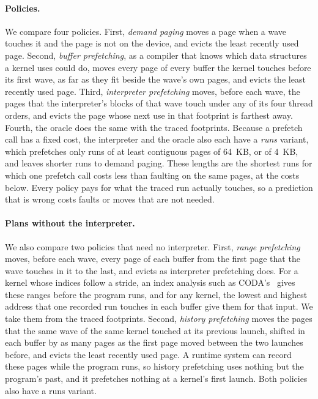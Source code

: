 \documentclass[11pt]{article}
\newcommand{\term}[1]{\emph{#1}}
\begin{document}
\paragraph{Policies.} We compare four policies. First, \term{demand paging} moves a page when a wave touches it and
the page is not on the device, and evicts the least recently used page. Second, \term{buffer prefetching}, as a
compiler that knows which data structures a kernel uses could do, moves every page of every buffer the kernel
touches before its first wave, as far as they fit beside the wave's own pages, and evicts the least recently used
page. Third, \term{interpreter prefetching} moves, before each wave, the pages that the interpreter's blocks of that
wave touch under any of its four thread orders, and evicts the page whose next use in that footprint is farthest
away. Fourth, the oracle does the same with the traced footprints. Because a prefetch call has a fixed cost, the
interpreter and the oracle also each have a \term{runs} variant, which prefetches only runs of at least
\numUvmMinRun{} contiguous pages of 64~KB, or \numUvmMinRunFour{} of 4~KB, and leaves shorter runs to demand paging.
These lengths are the shortest runs for which one prefetch call costs less than faulting on the same pages, at the
costs below. Every policy pays for what the traced run actually touches, so a prediction that is wrong costs faults
or moves that are not needed.

\paragraph{Plans without the interpreter.} We also compare two policies that need no interpreter. First,
\term{range prefetching} moves, before each wave, every page of each buffer from the first page that the wave
touches in it to the last, and evicts as interpreter prefetching does. For a kernel whose indices follow a stride,
an index analysis such as CODA's~\cite{Kim2018CODA} gives these ranges before the program runs, and for any kernel,
the lowest and highest address that one recorded run touches in each buffer give them for that input. We take them
from the traced footprints. Second, \term{history prefetching} moves the pages that the same wave of the same kernel
touched at its previous launch, shifted in each buffer by as many pages as the first page moved between the two
launches before, and evicts the least recently used page. A runtime system can record these pages while the program
runs, so history prefetching uses nothing but the program's past, and it prefetches nothing at a kernel's first
launch. Both policies also have a runs variant.
\end{document}
